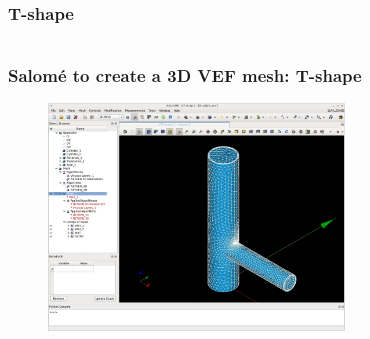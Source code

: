 \documentclass[10pt]{beamer}
\begin{document}
\subsubsection{T-shape}
\begin{frame}
\begin{columns}[c] 
\tableofcontents[sections={1-7},currentsection, currentsubsection]
\tableofcontents[sections={8-13},currentsection, currentsubsection]
\end{columns}
\end{frame}
\begin{frame}
\frametitle{Salom\'e to create a 3D VEF mesh: T-shape}

\begin{figure}
\includegraphics[width=0.7\textwidth]{PICTURES/salome17.jpg}
\end{figure}

\end{frame}
\end{document}
